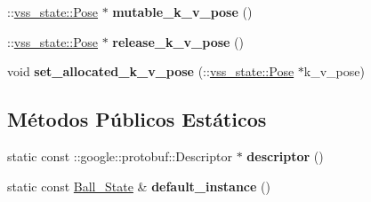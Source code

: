 \begin{DoxyCompactItemize}
\item 
\+::\hyperlink{classvss__state_1_1Pose}{vss\+\_\+state\+::\+Pose} $\ast$ {\bfseries mutable\+\_\+k\+\_\+v\+\_\+pose} ()\hypertarget{classvss__state_1_1Ball__State_ac3b62e9cfb792bc6942a98fb9aceb5ff}{}\label{classvss__state_1_1Ball__State_ac3b62e9cfb792bc6942a98fb9aceb5ff}

\item 
\+::\hyperlink{classvss__state_1_1Pose}{vss\+\_\+state\+::\+Pose} $\ast$ {\bfseries release\+\_\+k\+\_\+v\+\_\+pose} ()\hypertarget{classvss__state_1_1Ball__State_a2245ebd735cebe20ca68a202a8a0adf3}{}\label{classvss__state_1_1Ball__State_a2245ebd735cebe20ca68a202a8a0adf3}

\item 
void {\bfseries set\+\_\+allocated\+\_\+k\+\_\+v\+\_\+pose} (\+::\hyperlink{classvss__state_1_1Pose}{vss\+\_\+state\+::\+Pose} $\ast$k\+\_\+v\+\_\+pose)\hypertarget{classvss__state_1_1Ball__State_a191d7bdd20328826d877b1219da91e3e}{}\label{classvss__state_1_1Ball__State_a191d7bdd20328826d877b1219da91e3e}

\end{DoxyCompactItemize}
\subsection*{Métodos Públicos Estáticos}
\begin{DoxyCompactItemize}
\item 
static const \+::google\+::protobuf\+::\+Descriptor $\ast$ {\bfseries descriptor} ()\hypertarget{classvss__state_1_1Ball__State_adfc29a0088d19129c759d22494a74443}{}\label{classvss__state_1_1Ball__State_adfc29a0088d19129c759d22494a74443}

\item 
static const \hyperlink{classvss__state_1_1Ball__State}{Ball\+\_\+\+State} \& {\bfseries default\+\_\+instance} ()\hypertarget{classvss__state_1_1Ball__State_a762be08a3ad7dcbec17beb380b860f95}{}\label{classvss__state_1_1Ball__State_a762be08a3ad7dcbec17beb380b860f95}

\end{DoxyCompactItemize}
